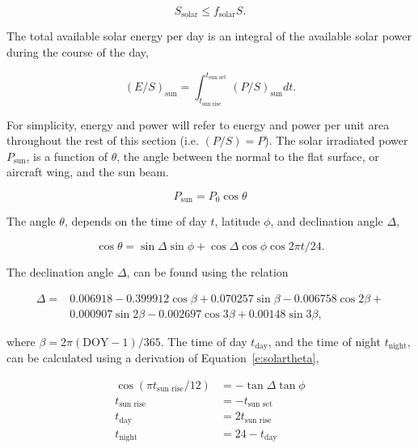 \begin{equation}
    \label{e:solarssolar}
    S_{\text{solar}} \leq f_{\text{solar}}S.
\end{equation}

The total available solar energy per day is an integral of the available solar power during the course of the day,

    \begin{equation}
        \label{e:solares}
        (E/S)_{\text{sun}} = \int_{t_{\text{sun rise}}}^{t_{\text{sun set}}} (P/S)_{\text{sun}} dt.
    \end{equation}

For simplicity, energy and power will refer to energy and power per unit area throughout the rest of this section (i.e. $(P/S) = P$). 
The solar irradiated power $P_{\text{sun}}$, is a function of $\theta$, the angle between the normal to the flat surface, or aircraft wing, and the sun beam.\cite{solar}

\begin{equation}
    \label{e:solarp}
    P_{\text{sun}} = P_0 \cos{\theta}
\end{equation}

The angle $\theta$, depends on the time of day $t$, latitude $\phi$, and declination angle $\Delta$,\cite{solar}

    \begin{equation}
        \label{e:solartheta}
        \cos{\theta} = \sin{\Delta} \sin{\phi} + \cos{\Delta} \cos{\phi} \cos{2\pi t/24}.
    \end{equation}

 The declination angle $\Delta$, can be found using the relation\cite{solar} 

    \begin{align}
        \label{e:solardelta}
        \Delta = &0.006918 - 0.399912 \cos{\beta} + 0.070257\sin{\beta} - 0.006758\cos{2\beta} + \nonumber \\
        & 0.000907\sin{2\beta} - 0.002697\cos{3\beta} + 0.00148\sin{3\beta},
    \end{align}

    where $\beta = 2\pi (\text{DOY}-1)/365$.
    The time of day $t_{\text{day}}$, and the time of night $t_{\text{night}}$, can be calculated using a derivation of Equation~\eqref{e:solartheta}, \cite{solar}

    \begin{align}
        \label{e:solartday}
        \cos{(\pi t_{\text{sun rise}}/12)} &= -\tan{\Delta} \tan{\phi} \\
        \label{e:solarsunrise}
        t_{\text{sun rise}} &= -t_{\text{sun set}} \\
        \label{e:solartday2}
        t_{\text{day}} &= 2t_{\text{sun rise}} \\
        \label{e:solartnight}
        t_{\text{night}} &= 24 - t_{\text{day}}
    \end{align}

